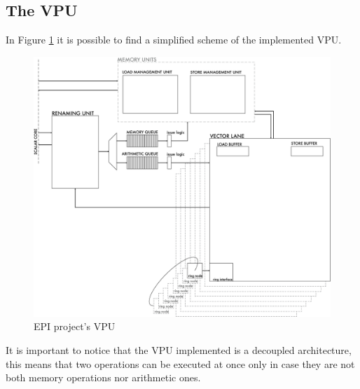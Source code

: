 \subsection{The VPU}
In Figure \ref{VPU} it is possible to find a simplified scheme of the implemented VPU.

\begin{figure}[H]
    \centering
    \includegraphics[scale = 0.5]{Chapter_1/img/VPU.png}
    \caption{EPI project's VPU}
    \label{VPU}
\end{figure}
It is important to notice that the VPU implemented is a decoupled architecture, this means that two operations can be executed at once only in case they are not both memory operations nor arithmetic ones.


